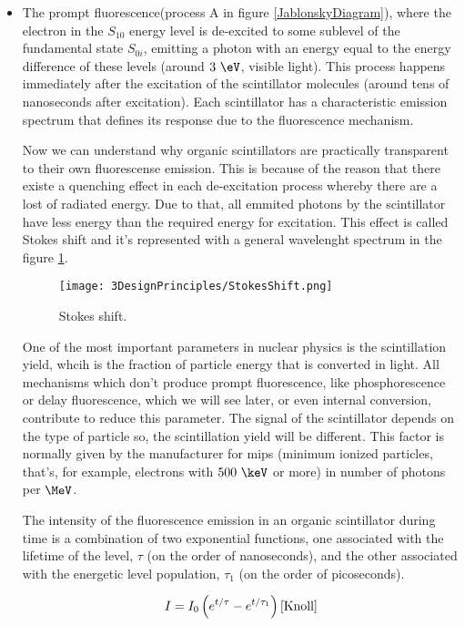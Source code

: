 \begin{itemize}

\item{} The prompt fluorescence(process A in figure \ref{JablonskyDiagram}), where the electron in the $S_{10}$ energy level  is de-excited to some sublevel of the fundamental state $S_{0i}$, emitting a photon with an energy equal to the energy difference of these levels (around $3~\eV$, visible light). This process happens immediately after the excitation of the scintillator molecules (around tens of nanoseconds after excitation). Each scintillator has a characteristic emission spectrum that defines its response due to the fluorescence mechanism. 

Now we can understand why organic scintillators are practically transparent to their own fluorescense emission. This is because of the reason that there existe a quenching effect in each de-excitation process whereby there are a lost of radiated energy. Due to that, all emmited  photons by the scintillator have less energy than the required energy for excitation. This effect is called Stokes shift and it's represented with a general wavelenght spectrum in the figure \ref{StokesShift}.

\begin{figure}[htbp]
\centering
\texttt{[image: 3DesignPrinciples/StokesShift.png]}
\caption{Stokes shift.\label{StokesShift}~\cite{Knoll}}
\end{figure}

One of the most important parameters in nuclear physics is the scintillation yield, whcih is the fraction of particle energy that is converted in light. All mechanisms which don't produce prompt fluorescence, like phosphorescence or delay fluorescence, which we will see later, or even internal conversion, contribute to reduce this parameter. The signal of the scintillator depends on the type of particle so, the scintillation yield will be different. This factor is normally given by the manufacturer for mips (minimum ionized particles, that's, for example, electrons with $500~\keV$ or more) in number of photons per $\MeV$.

The intensity of the fluorescence emission in an organic scintillator during time is a combination of two exponential functions, one associated with the lifetime of the level, $\tau$ (on the order of nanoseconds), and the other associated with the energetic level population, $\tau_1$ (on the order of picoseconds).

$$I=I_0\left(e^{t/\tau} - e^{t/\tau_1}\right) \cite{Knoll}$$


\end{itemize}
